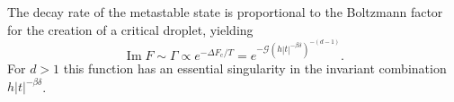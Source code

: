 \documentclass[aps,prl,reprint]{revtex4-1}
\def\[{\begin{equation}}
\def\]{\end{equation}}
\def\im{\mathop{\mathrm{Im}}\nolimits}
\def\c{\mathrm c}
\def\fM{\mathcal M}  %
\def\fS{\mathcal S}  %
\def\fG{\mathcal G}  %
\def\sq{\mathrm{sq}}
\def\dim{d}
\begin{document}
The decay rate of the metastable state is proportional to the Boltzmann factor
for the creation of a critical droplet, yielding
\[
  \im F\sim\Gamma\propto e^{-\Delta F_\c/T}=e^{-\fG(h|t|^{-\beta\delta})^{-(\dim-1)}}.
\]
For $d>1$ this function has an essential singularity in the invariant
combination $h|t|^{-\beta\delta}$.

\end{document}

